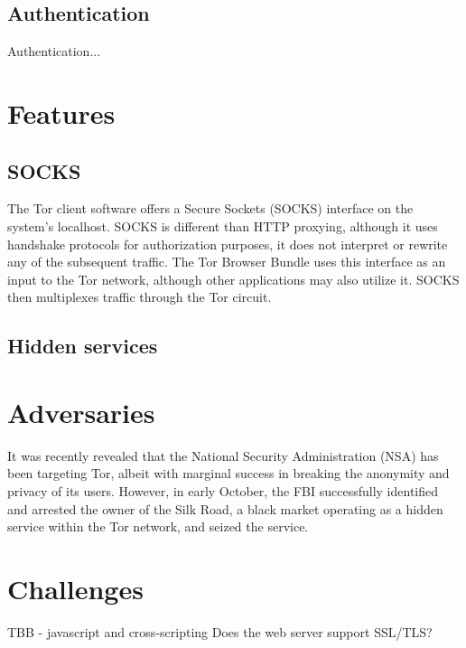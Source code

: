 \documentclass[journal]{IEEEtran}
\begin{document}
\subsection{Authentication}

Authentication...

\section{Features}

\subsection{SOCKS}

The Tor client software offers a Secure Sockets (SOCKS) interface on the system's localhost. SOCKS is different than HTTP proxying, although it uses handshake protocols for authorization purposes, it does not interpret or rewrite any of the subsequent traffic. The Tor Browser Bundle uses this interface as an input to the Tor network, although other applications may also utilize it. SOCKS then multiplexes traffic through the Tor circuit.

\subsection{Hidden services}


\section{Adversaries}

It was recently revealed that the National Security Administration (NSA) has been targeting Tor, albeit with marginal success in breaking the anonymity and privacy of its users. However, in early October, the FBI successfully identified and arrested the owner of the Silk Road, a black market operating as a hidden service within the Tor network, and seized the service.

\section{Challenges}

TBB - javascript and cross-scripting
Does the web server support SSL/TLS?
\end{document}
